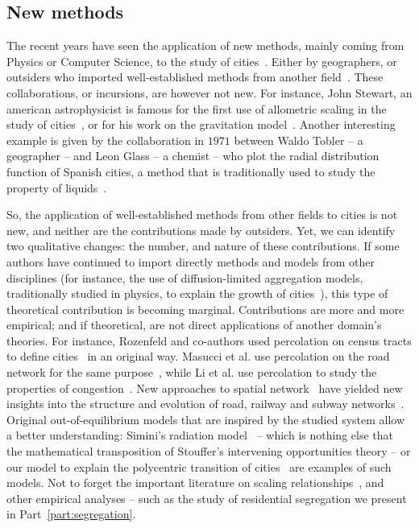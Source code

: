 \subsection{New methods}
\label{sub:new_methods}

The recent years have seen the application of new methods, mainly coming from
Physics or Computer Science, to the study of cities~\cite{Dupuy:2015}. Either by geographers, or
outsiders who imported well-established methods from another
field~\cite{Batty:1995}. These collaborations, or incursions, are however not
new. For instance, John Stewart, an american astrophysicist is famous for the first use of allometric
scaling in the study of cities~\cite{Stewart:1947}, or for his work 
on the gravitation model~\cite{Stewart:1948}. Another interesting example is
given by the collaboration in $1971$ between Waldo Tobler -- a geographer -- and
Leon Glass -- a chemist -- who plot the radial distribution function of Spanish
cities, a method that is traditionally used to study the property of
liquids~\cite{Glass:1971}.

So, the application of well-established methods from other fields to cities is
not new, and neither are the contributions made by outsiders. Yet, we can
identify two qualitative changes: the number, and nature of these contributions.
If some authors have continued to import directly methods and models from other
disciplines (for instance, the use of diffusion-limited aggregation models,
traditionally studied in physics, to explain the growth of
cities~\cite{Makse:1995}), this type of theoretical contribution is becoming
marginal. Contributions are more and more empirical; and if theoretical, are not
direct applications of another domain's theories. For
instance, Rozenfeld and co-authors used percolation on census tracts to define
cities~\cite{Rozenfeld:2008} in an original way. Masucci et al. use percolation
on the road network for the same purpose~\cite{Masucci:2015}, while Li et al.
use percolation to study the properties of congestion~\cite{Li:2015}. New
approaches to spatial network~\cite{Barthelemy:2011} have yielded new insights
into the structure and evolution of road, railway and subway networks~\cite{Strano:2012,
Barthelemy:2013,Louf:2013_emergence,Louf:2014_scaling,Louf:2014}.
Original out-of-equilibrium models that are inspired by the studied system allow
a better understanding: Simini's radiation model~\cite{Simini:2012,Simini:2013}
 -- which is nothing else that the mathematical transposition of Stouffer's
 intervening opportunities theory -- or our model to explain the polycentric
 transition of cities~\cite{Louf:2013_polycentric} are examples of such models.
 Not to forget the important literature on scaling
 relationships~\cite{Bettencourt:2007, Bettencourt:2013, Louf:2014_mobility,
 Arcaute:2014, Louf:2014_smog}, and other empirical analyses -- such as the
 study of residential segregation we present in Part~\ref{part:segregation}.


